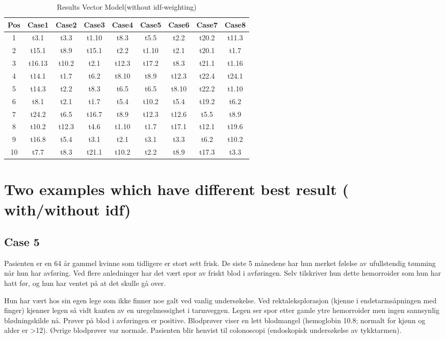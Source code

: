 \begin{table}[h!]
\begin{center}
\begin{tabular}{ | c c c c c c c c c | }
\hline
\textbf{Pos} & \textbf{Case1} & \textbf{Case2} & \textbf{Case3} & \textbf{Case4} & \textbf{Case5} & \textbf{Case6} & \textbf{Case7} & \textbf{Case8} \\ \hline
1 & t3.1 & t3.3 & t1.10 & t8.3 & t5.5 & t2.2 & t20.2 & t11.3 \\
2 & t15.1 & t8.9 & t15.1 & t2.2 & t1.10 & t2.1 & t20.1 & t1.7 \\
3 & t16.13 & t10.2 & t2.1 & t12.3 & t17.2 & t8.3 & t21.1 & t1.16 \\
4 & t14.1 & t1.7 & t6.2 & t8.10 & t8.9 & t12.3 & t22.4 & t24.1 \\
5 & t14.3 & t2.2 & t8.3 & t6.5 & t6.5 & t8.10 & t22.2 & t1.10 \\
6 & t8.1 & t2.1 & t1.7 & t5.4 & t10.2 & t5.4 & t19.2 & t6.2 \\
7 & t24.2 & t6.5 & t16.7 & t8.9 & t12.3 & t12.6 & t5.5 & t8.9 \\
8 & t10.2 & t12.3 & t4.6 & t1.10 & t1.7 & t17.1 & t12.1 & t19.6 \\
9 & t16.8 & t5.4 & t3.1 & t2.1 & t3.1 & t3.3 & t6.2 & t10.2 \\
10 & t7.7 & t8.3 & t21.1 & t10.2 & t2.2 & t8.9 & t17.3 & t3.3 \\
\hline
\end{tabular}
\end{center}
\caption{Results Vector Model(without idf-weighting)}
\end{table}

\pagebreak
\section{Two examples which have different best result ( with/without idf)}
\subsection{Case 5}
Pasienten er en 64 år gammel kvinne som tidligere er stort sett frisk. De siste 5 månedene har hun merket følelse av ufullstendig tømming når hun har avføring. Ved flere anledninger har det vært spor av friskt blod i avføringen. Selv tilskriver hun dette hemorroider som hun har hatt før, og hun har ventet på at det skulle gå over.

Hun har vært hos sin egen lege som ikke finner noe galt ved vanlig undersøkelse. Ved rektaleksplorasjon (kjenne i endetarmsåpningen med finger) kjenner legen så vidt kanten av en uregelmessighet i tarmveggen. Legen ser spor etter gamle ytre hemorroider men ingen sannsynlig blødningskilde nå. Prøver på blod i avføringen er positive. Blodprøver viser en lett blodmangel (hemoglobin 10.8; normalt for kjønn og alder er >12). Øvrige blodprøver var normale. Pasienten blir henvist til colonoscopi (endoskopisk undersøkelse av tykktarmen).

